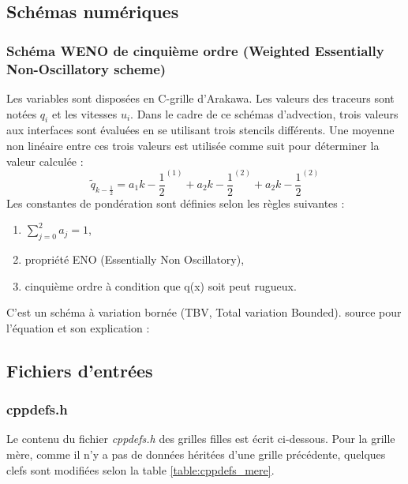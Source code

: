 \documentclass[10pt,a4paper,titlepage]{article}
\begin{document}
\subsection{Schémas numériques}
\subsubsection{Schéma WENO de cinquième ordre (Weighted Essentially Non-Oscillatory scheme)}\label{anx:WENO}
Les variables sont disposées en C-grille d'Arakawa.
Les valeurs des traceurs sont notées $q_i$ et les vitesses $u_i$.
Dans le cadre de ce schémas d'advection, trois valeurs aux interfaces sont évaluées en se utilisant trois stencils différents. Une moyenne non linéaire entre ces trois valeurs est utilisée comme suit pour déterminer la valeur calculée :
$$\tilde{q}_{k-\frac{1}{2}} = a_1k-\frac{1}{2}^{(1)} + a_2k-\frac{1}{2}^{(2)} + a_2k-\frac{1}{2}^{(2)}$$
Les constantes de pondération sont définies selon les règles suivantes :
\begin{enumerate}
    \item $\sum_{j=0}^{2}a_j = 1$,
    \item propriété ENO (Essentially Non Oscillatory),
    \item cinquième ordre à condition que q(x) soit peut rugueux.
\end{enumerate}
C'est un schéma à variation bornée (TBV, Total variation Bounded).
source pour l'équation et son explication : \cite{schemas_advection}


\subsection{Fichiers d'entrées}
\subsubsection{cppdefs.h}
\label{anx:cppdefs}
Le contenu du fichier \textit{cppdefs.h} des grilles filles est écrit ci-dessous. Pour la grille mère, comme il n'y a pas de données héritées d'une grille précédente, quelques clefs sont modifiées selon la table \ref{table:cppdefs_mere}.
\end{document}
